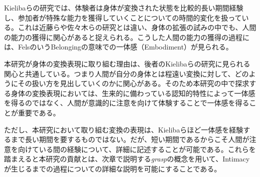 Kielibaらの研究では、体験者は身体が変換された状態を比較的長い期間経験し、参加者が特殊な能力を獲得していくことについての時間的変化を扱っている。これは近藤らや佐々木らの研究とは違い、身体の拡張の試みの中でも、人間の能力の獲得に関心があると捉えられる。こうした人間の能力の獲得の過程には、FelsのいうBelongingの意味での一体感（Embodiment）が見られる。

本研究が身体の変換表現に取り組む理由は、後者のKielibaらの研究に見られる関心と共通している。つまり人間が自分の身体とは程遠い変換に対して、どのようにその扱い方を見出していくのかに関心がある。そのため本研究の中で探求する身体の変換表現においては、生来的に備わっている認知的特性によって一体感を得るのではなく、人間が意識的に注意を向けて体験することで一体感を得ることが重要である。

ただし、本研究において取り組む変換の表現は、Kielibaらほど一体感を経験するまで長い期間を要するものではない。だが、短い期間であるからこそ人間が注意を向けている間の経験について、詳細に記述することが可能である。これらを踏まえると本研究の貢献とは、次章で説明する\textit{grasp}の概念を用いて、Intimacyが生じるまでの過程についての詳細な説明を可能にすることである。



